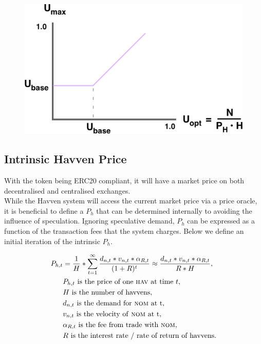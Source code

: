 \begin{figure}[h!]
    \centering
    \includegraphics[width=.75\textwidth]{img/U_max}
\end{figure}

\newpage

\subsection{Intrinsic Havven Price} With the \HAV{} token being ERC20 compliant, it will have a market price on both decentralised and centralised exchanges. \\

\noindent While the Havven system will access the current market price via a price oracle, it is beneficial to define a $P_h$ that can be determined internally to avoiding the influence of speculation. Ignoring speculative demand, $P_h$ can be expressed as a function of the transaction fees that the system charges. Below we define an initial iteration of the intrinsic $P_h$.

\begin{align*} 
P_{h,t} &= \frac{1}{H}* \sum\limits_{t=1}^\infty \frac{d_{n,t} *v_{n,t} * \alpha_{R,t}}{(1+R)^t} \approx \frac{d_{n,t} *v_{n,t} * \alpha_{R,t}}{R * H}, \\
& P_{h,t} \text{ is the price of one \textsc{hav}{} at time } t, \\
& H \text{ is the number of havvens}, \\
& d_{n,t} \text{ is the demand for \textsc{nom}{} at t}, \\
& v_{n,t} \text{ is the velocity of \textsc{nom}{} at t}, \\
& \alpha_{R,t} \text{ is the fee from trade with \textsc{nom}{}}, \\
& R \text{ is the interest rate / rate of return of havvens}. \\
\end{align*}

\newpage
